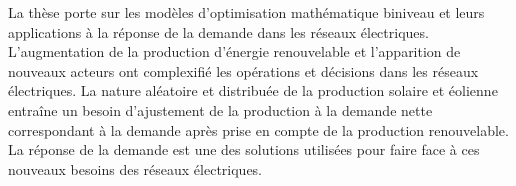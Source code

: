 La thèse porte sur les modèles d'optimisation mathématique biniveau
et leurs applications à la réponse de la demande dans les réseaux
électriques.\clinebreak
L'augmentation de la production d'énergie renouvelable
et l'apparition de nouveaux acteurs ont complexifié les opérations
et décisions dans les réseaux électriques.
La nature aléatoire et distribuée de la production solaire et éolienne
entraîne un besoin d'ajustement de la production à la demande nette
correspondant à la demande après prise en compte de la production renouvelable.\clinebreak
La réponse de la demande est une des solutions utilisées pour
faire face à ces nouveaux besoins des réseaux électriques.
